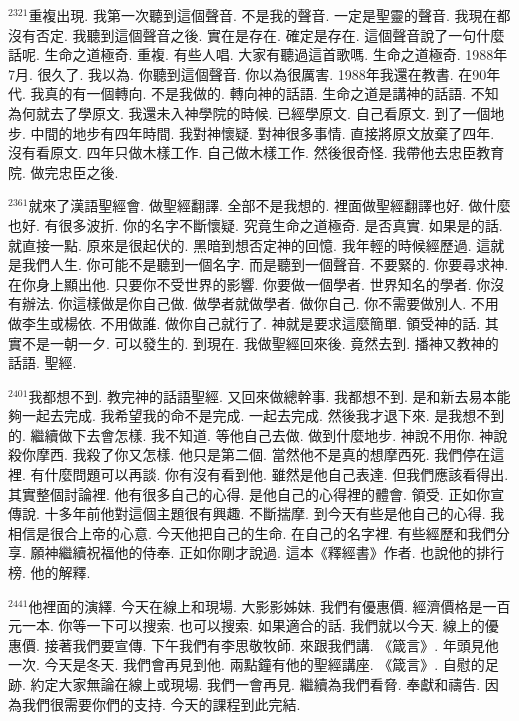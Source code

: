 \documentclass{book}
\begin{document}
$^{2321}$重複出現.
我第一次聽到這個聲音.
不是我的聲音.
一定是聖靈的聲音.
我現在都沒有否定.
我聽到這個聲音之後.
實在是存在.
確定是存在.
這個聲音說了一句什麼話呢.
生命之道極奇.
重複.
有些人唱.
大家有聽過這首歌嗎.
生命之道極奇.
1988年7月.
很久了.
我以為.
你聽到這個聲音.
你以為很厲害.
1988年我還在教書.
在90年代.
我真的有一個轉向.
不是我做的.
轉向神的話語.
生命之道是講神的話語.
不知為何就去了學原文.
我還未入神學院的時候.
已經學原文.
自己看原文.
到了一個地步.
中間的地步有四年時間.
我對神懷疑.
對神很多事情.
直接將原文放棄了四年.
沒有看原文.
四年只做木樣工作.
自己做木樣工作.
然後很奇怪.
我帶他去忠臣教育院.
做完忠臣之後.

$^{2361}$就來了漢語聖經會.
做聖經翻譯.
全部不是我想的.
裡面做聖經翻譯也好.
做什麼也好.
有很多波折.
你的名字不斷懷疑.
究竟生命之道極奇.
是否真實.
如果是的話.
就直接一點.
原來是很起伏的.
黑暗到想否定神的回憶.
我年輕的時候經歷過.
這就是我們人生.
你可能不是聽到一個名字.
而是聽到一個聲音.
不要緊的.
你要尋求神.
在你身上顯出他.
只要你不受世界的影響.
你要做一個學者.
世界知名的學者.
你沒有辦法.
你這樣做是你自己做.
做學者就做學者.
做你自己.
你不需要做別人.
不用做李生或楊依.
不用做誰.
做你自己就行了.
神就是要求這麼簡單.
領受神的話.
其實不是一朝一夕.
可以發生的.
到現在.
我做聖經回來後.
竟然去到.
播神又教神的話語.
聖經.

$^{2401}$我都想不到.
教完神的話語聖經.
又回來做總幹事.
我都想不到.
是和新去易本能夠一起去完成.
我希望我的命不是完成.
一起去完成.
然後我才退下來.
是我想不到的.
繼續做下去會怎樣.
我不知道.
等他自己去做.
做到什麼地步.
神說不用你.
神說殺你摩西.
我殺了你又怎樣.
他只是第二個.
當然他不是真的想摩西死.
我們停在這裡.
有什麼問題可以再談.
你有沒有看到他.
雖然是他自己表達.
但我們應該看得出.
其實整個討論裡.
他有很多自己的心得.
是他自己的心得裡的體會.
領受.
正如你宣傳說.
十多年前他對這個主題很有興趣.
不斷揣摩.
到今天有些是他自己的心得.
我相信是很合上帝的心意.
今天他把自己的生命.
在自己的名字裡.
有些經歷和我們分享.
願神繼續祝福他的侍奉.
正如你剛才說過.
這本《釋經書》作者.
也說他的排行榜.
他的解釋.

$^{2441}$他裡面的演繹.
今天在線上和現場.
大影影姊妹.
我們有優惠價.
經濟價格是一百元一本.
你等一下可以搜索.
也可以搜索.
如果適合的話.
我們就以今天.
線上的優惠價.
接著我們要宣傳.
下午我們有李思敬牧師.
來跟我們講.
《箴言》.
年頭見他一次.
今天是冬天.
我們會再見到他.
兩點鐘有他的聖經講座.
《箴言》.
自慰的足跡.
約定大家無論在線上或現場.
我們一會再見.
繼續為我們看脅.
奉獻和禱告.
因為我們很需要你們的支持.
今天的課程到此完結.
\newpage
\end{document}
